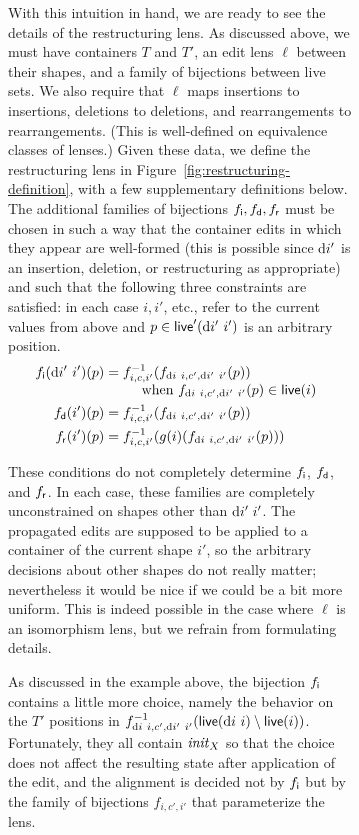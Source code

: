 \begin{figure}
\begin{figure}
With this intuition in hand, we are ready to see the details of the
restructuring lens. As discussed above, we must have containers $T$ and
$T'$, an edit lens $\ell$ between their shapes, and a family of bijections
between live sets. We also require that $\ell$ maps insertions to
insertions, deletions to deletions, and rearrangements to rearrangements.
(This is well-defined on equivalence classes of lenses.)
Given these data, we define the restructuring lens in
Figure~\ref{fig:restructuring-definition}, with a few supplementary
definitions below.
%
The additional families of bijections $f_{\mathsf{i}}, f_{\mathsf{d}}, f_{\mathsf{r}}$ must be chosen in such a
way that the container edits in which they appear are well-formed
(this is possible since $\textrm{d} i'$ is an insertion, deletion, or
restructuring as appropriate) and such that the following three constraints are
satisfied: in each case $i,i'$, etc.,  refer to the current values from above and $p\in \mathsf{live}'(\textrm{d} i'\ i')$ is an arbitrary position. 
\begin{align*}
f_\mli(\di'\ i')(p) &=
\begin{array}[t]{@{}l}
f^{-1}_{i,c,i'}(f_{\di\ i,c',\di'\ i'}(p))\\ 
\quad \text{ when $f_{\di\ i,c',\di'\ i'}(p)\in\live(i)$}
\end{array}\\
f_\mld(i')(p) &= f^{-1}_{i,c,i'}(f_{\di\ i,c',\di'\ i'}(p))\\
f_\mlr(i')(p) &= f_{i,c,i'}^{-1}(g(i)(f_{\di\ i,c',\di'\ i'}(p)))
\end{align*}

These conditions do not completely determine $f_{\mathsf{i}}$, $f_{\mathsf{d}}$, and $f_{\mathsf{r}}$. In
each case, these families are completely unconstrained on shapes other than
$\textrm{d} i'\;i'$. The propagated edits are supposed to be applied to a container
of the current shape $i'$, so the arbitrary decisions about other shapes do
not really matter;
nevertheless it would be nice if we could be a bit more uniform. This
is indeed possible in the case where $\ell$ is an isomorphism lens, but we
refrain from formulating details.

As discussed in the example above, the bijection $f_{\mathsf{i}}$ contains a little
more choice, namely the behavior on the $T'$ positions in $f_{\textrm{d} i\
i,c',\textrm{d} i'\ i'}^{-1}(\mathsf{live}(\textrm{d} i\ i)\setminus\mathsf{live}(i))$. Fortunately, they all
contain $\mathit{init}_X$ so that the choice does not affect the resulting
state after application of the edit, and the alignment is decided not by
$f_{\mathsf{i}}$ but by the family of bijections $f_{i,c',i'}$ that parameterize the
lens.


\end{figure}
\end{figure}
